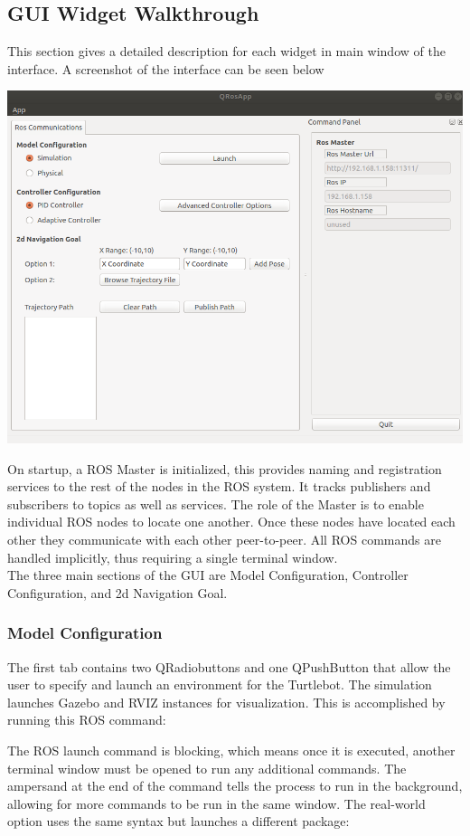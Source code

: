 \documentclass[12]{article}
\begin{document}
\subsection{GUI Widget Walkthrough}
This section gives a detailed description for each widget in main window of the interface. A screenshot of the interface can be seen below
\begin{center}
\includegraphics[width=0.9\linewidth]{images/gui_screenshot.png} \\
\end{center}
On startup, a ROS Master is initialized, this provides naming and registration services to the rest of the nodes in the ROS system. It tracks publishers and subscribers to topics as well as services. The role of the Master is to enable individual ROS nodes to locate one another. Once these nodes have located each other they communicate with each other peer-to-peer. All ROS commands are handled implicitly, thus requiring a single terminal window.\\

The three main sections of the GUI are Model Configuration, Controller Configuration, and 2d Navigation Goal.\\

\subsubsection{Model Configuration}
The first tab contains two QRadiobuttons and one QPushButton that allow the user to specify and launch an environment for the Turtlebot. The simulation launches Gazebo and RVIZ instances for visualization. This is accomplished by running this ROS command:

The ROS launch command is blocking, which means once it is executed, another terminal window must be opened to run any additional commands. The ampersand at the end of the command tells the process to run in the background, allowing for more commands to be run in the same window. The real-world option uses the same syntax but launches a different package:

\end{document}
